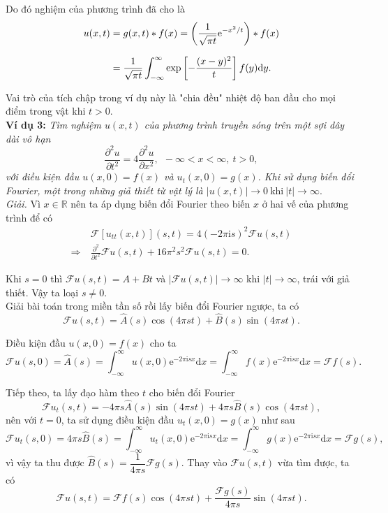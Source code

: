 \documentclass[10pt, a4paper]{article}
\begin{document}
	Do đó nghiệm của phương trình đã cho là \begin{align*}
		u(x,t)&=g(x,t)*f(x)=\left(\frac{1}{\sqrt{\pi t}}\mathrm e^{-x^2/t}\right)*f(x)\\
		\noalign{\vskip7pt}
		&=\frac{1}{\sqrt{\pi t}}\int_{-\infty}^\infty\exp\left[-\frac{(x-y)^2}{t}\right]f(y)\mathrm dy.
	\end{align*}
	
	Vai trò của tích chập trong ví dụ này là "chia đều" nhiệt độ ban đầu cho mọi điểm trong vật khi $t>0$.\\
	
	\textbf{Ví dụ 3:} \textit{Tìm nghiệm $u(x,t)$ của phương trình truyền sóng trên một sợi dây dài vô hạn} $$\frac{\partial^2u}{\partial t^2}=4\frac{\partial^2u}{\partial x^2},~~-\infty<x<\infty,~t>0,$$
	\textit{với điều kiện đầu $u(x,0)=f(x)$ và $u_t(x,0)=g(x)$. Khi sử dụng biến đổi Fourier, một trong những giả thiết từ vật lý là $|u(x,t)|\to0~\text{khi}~|t|\to\infty.$}\\
	
	\textit{Giải.} Vì $x\in\mathbb R$ nên ta áp dụng biến đổi Fourier theo biến $x$ ở hai vế của phương trình để có \begin{align*}
		&\mathcal F[u_{tt}(x,t)](s,t)=4(-2\pi\mathrm is)^2\mathcal Fu(s,t)\\
		\Rightarrow~&\frac{\partial^2}{\partial t^2}\mathcal Fu(s,t)+16\pi^2s^2\mathcal Fu(s,t)=0.
	\end{align*}
	
	Khi $s=0$ thì $\mathcal Fu(s,t)=A+Bt$ và $|\mathcal Fu(s,t)|\to\infty$ khi $|t|\to\infty$, trái với giả thiết. Vậy ta loại $s\ne0$.\\
	
	Giải bài toán trong miền tần số rồi lấy biến đổi Fourier ngược, ta có $$\mathcal Fu(s,t)=\widehat A(s)\cos(4\pi st)+\widehat B(s)\sin(4\pi st).$$
	
	Điều kiện đầu $u(x,0)=f(x)$ cho ta $$\mathcal Fu(s,0)=\widehat A(s)=\int_{-\infty}^\infty u(x,0)\mathrm e^{-2\pi\mathrm isx}\mathrm dx=\int_{-\infty}^\infty f(x)\mathrm e^{-2\pi\mathrm isx}\mathrm dx=\mathcal Ff(s).$$
	
	Tiếp theo, ta lấy đạo hàm theo $t$ cho biến đổi Fourier $$\mathcal Fu_t(s,t)=-4\pi s\widehat A(s)\sin(4\pi st)+4\pi s\widehat B(s)\cos(4\pi st),$$
	nên với $t=0$, ta sử dụng điều kiện đầu $u_t(x,0)=g(x)$ như sau $$\mathcal Fu_t(s,0)=4\pi s\widehat B(s)=\int_{-\infty}^\infty u_t(x,0)\mathrm e^{-2\pi\mathrm isx}\mathrm dx=\int_{-\infty}^\infty g(x)\mathrm e^{-2\pi\mathrm isx}\mathrm dx=\mathcal Fg(s),$$
	vì vậy ta thu được $\widehat B(s)=\dfrac{1}{4\pi s}\mathcal Fg(s)$. Thay vào $\mathcal Fu(s,t)$ vừa tìm được, ta có $$\mathcal Fu(s,t)=\mathcal Ff(s)\cos(4\pi st)+\frac{\mathcal Fg(s)}{4\pi s}\sin(4\pi st).$$
	
\end{document}
